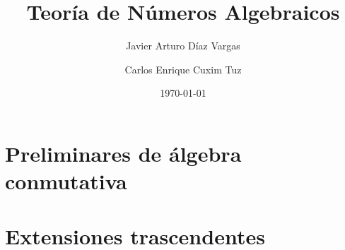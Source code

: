 \documentclass[11pt]{book}
\title{Teoría de Números Algebraicos}
\author{Javier Arturo Díaz Vargas \and Carlos Enrique Cuxim Tuz}
\date{\today}
\begin{document}
\maketitle

\tableofcontents



\chapter{Preliminares de álgebra conmutativa}


\chapter{Extensiones trascendentes}


  
\end{document}
